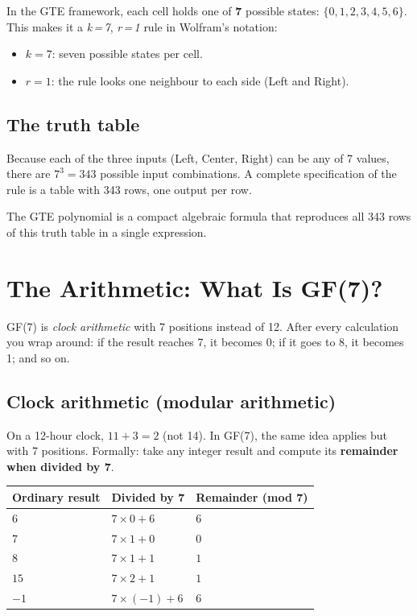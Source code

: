 \documentclass[11pt,a4paper]{article}
\newcommand{\term}[1]{\textbf{#1}}
\begin{document}
In the GTE framework, each cell holds one of \textbf{7} possible states:
$\{0, 1, 2, 3, 4, 5, 6\}$.  This makes it a \emph{k\,=\,7}, \emph{r\,=\,1}
rule in Wolfram's notation:
\begin{itemize}
  \item $k = 7$: seven possible states per cell.
  \item $r = 1$: the rule looks one neighbour to each side (Left and Right).
\end{itemize}

\subsection{The truth table}

Because each of the three inputs (Left, Center, Right) can be any of
7 values, there are $7^3 = 343$ possible input combinations.  A complete
specification of the rule is a table with 343 rows, one output per row.

The GTE polynomial is a compact algebraic formula that reproduces all
343 rows of this truth table in a single expression.

\section{The Arithmetic: What Is GF(7)?}

\begin{tcolorbox}[colback=boxorange,colframe=orange!60!black,title=Key idea]
GF(7) is \emph{clock arithmetic} with 7 positions instead of 12.
After every calculation you wrap around: if the result reaches 7, it
becomes 0; if it goes to 8, it becomes 1; and so on.
\end{tcolorbox}

\subsection{Clock arithmetic (modular arithmetic)}

On a 12-hour clock, $11 + 3 = 2$ (not 14).  In GF(7), the same idea applies
but with 7 positions.  Formally: take any integer result and compute its
\term{remainder when divided by 7}.

\bigskip
\begin{center}
\begin{tabular}{lll}
\toprule
Ordinary result & Divided by 7 & Remainder (mod 7) \\
\midrule
$6$  & $7 \times 0 + 6$ & $6$ \\
$7$  & $7 \times 1 + 0$ & $0$ \\
$8$  & $7 \times 1 + 1$ & $1$ \\
$15$ & $7 \times 2 + 1$ & $1$ \\
$-1$ & $7 \times (-1) + 6$ & $6$ \\
\bottomrule
\end{tabular}
\end{center}
\bigskip
\end{document}
